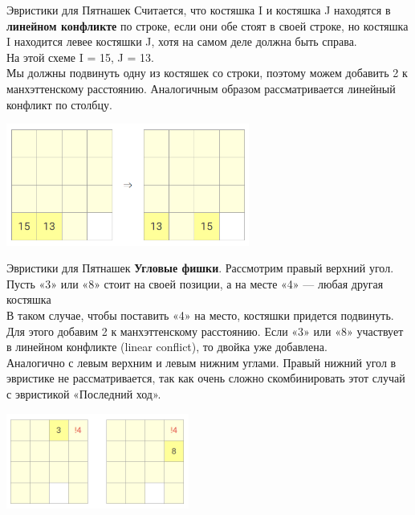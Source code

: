 \documentclass[10pt]{beamer}
\begin{document}
\begin{frame}[fragile]{Эвристики для Пятнашек}
Считается, что костяшка I и костяшка J находятся в \textbf{линейном конфликте} по строке, если они обе стоят в своей строке, но костяшка I находится левее костяшки J, хотя на самом деле должна быть справа. \\
На этой схеме I = 15, J = 13.
\\
Мы должны подвинуть одну из костяшек со строки, поэтому можем добавить 2 к манхэттенскому расстоянию. Аналогичным образом рассматривается линейный конфликт по столбцу.
\begin{center}
\includegraphics[width=8cm]{Term_2/Source/images/linear_conflict.png}
\end{center}
\end{frame}



\begin{frame}[fragile]{Эвристики для Пятнашек}
\textbf{Угловые фишки}. Рассмотрим правый верхний угол. Пусть «3» или «8» стоит на своей позиции, а на месте «4» — любая другая костяшка
\\
В таком случае, чтобы поставить «4» на место, костяшки придется подвинуть. Для этого добавим 2 к манхэттенскому расстоянию. Если «3» или «8» участвует в линейном конфликте (linear conflict), то двойка уже добавлена.
\\
Аналогично с левым верхним и левым нижним углами. Правый нижний угол в эвристике не рассматривается, так как очень сложно скомбинировать этот случай с эвристикой «Последний ход».
\begin{center}
\includegraphics[width=6cm]{Term_2/Source/images/corner.png}
\end{center}
\end{frame}
\end{document}
